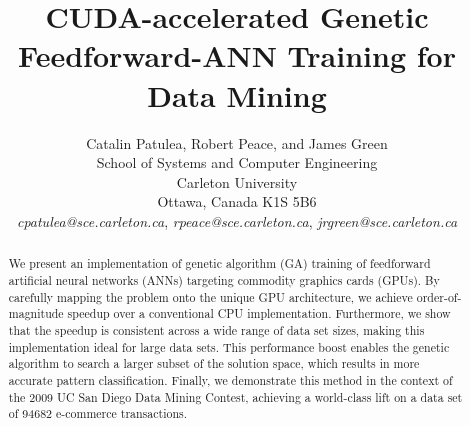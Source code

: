 \documentclass[11pt]{article}       %
\begin{document}


\title{CUDA-accelerated Genetic Feedforward-ANN Training for Data Mining}


\author{
Catalin Patulea, Robert Peace, and James Green\\
School of Systems and Computer Engineering\\
Carleton University\\
Ottawa, Canada K1S 5B6\\
{\em cpatulea@sce.carleton.ca}, {\em rpeace@sce.carleton.ca}, {\em jrgreen@sce.carleton.ca}
} %

\maketitle

\begin{abstract}
We present an implementation of genetic algorithm (GA) training of feedforward artificial neural networks (ANNs) targeting commodity graphics cards (GPUs). By carefully mapping the problem onto the unique GPU architecture, we achieve order-of-magnitude speedup over a conventional CPU implementation. Furthermore, we show that the speedup is consistent across a wide range of data set sizes, making this implementation ideal for large data sets. This performance boost enables the genetic algorithm to search a larger subset of the solution space, which results in more accurate pattern classification. Finally, we demonstrate this method in the context of the 2009 UC San Diego Data Mining Contest, achieving a world-class lift on a data set of 94682 e-commerce transactions.
\end{abstract}

\end{document}

